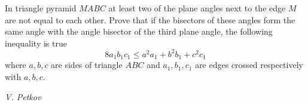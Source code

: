 In triangle pyramid $MABC$ at least two of the plane angles next to the edge $M$ are not equal to each other. Prove that if the bisectors of these angles form the same angle with the angle bisector of the third plane angle, the following inequality is true
$$8a_1b_1c_1\le a^2a_1+b^2b_1+c^2c_1$$where $a,b,c$ are sides of triangle $ABC$ and $a_1,b_1,c_1$ are edges crossed respectively with $a,b,c$.

\textit{V. Petkov}